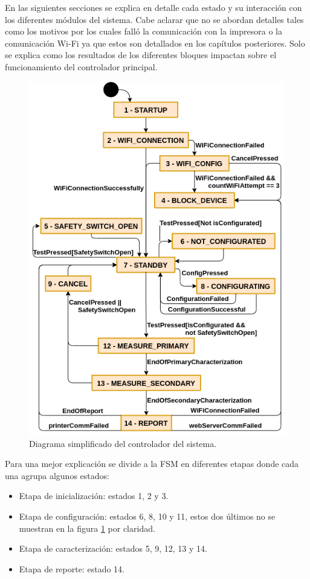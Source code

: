 En las siguientes secciones se explica en detalle cada estado y su interacción con los diferentes módulos del sistema. Cabe aclarar que no se abordan detalles tales como los motivos por los cuales falló la comunicación con la impresora o la comunicación Wi-Fi ya que estos son detallados en los capítulos posteriores. Solo se explica como los resultados de los diferentes bloques impactan sobre el funcionamiento del controlador principal.
\pagebreak
\begin{figure}[ht]
	\centering
	\includegraphics[scale=1]{./Figures/MainFSM_red.png}
	\caption{Diagrama simplificado del controlador del sistema.}
	\label{fig:MainFSM_red}
\end{figure}

Para una mejor explicación se divide a la FSM en diferentes etapas donde cada una agrupa algunos estados:
\begin{itemize}
\item Etapa de inicialización: estados 1, 2 y 3.
\item Etapa de configuración: estados 6, 8, 10 y 11, estos dos últimos no se muestran en la figura \ref{fig:MainFSM_red} por claridad.
\item Etapa de caracterización: estados 5, 9, 12, 13 y 14. 
\item Etapa de reporte: estado 14.
\end{itemize}

